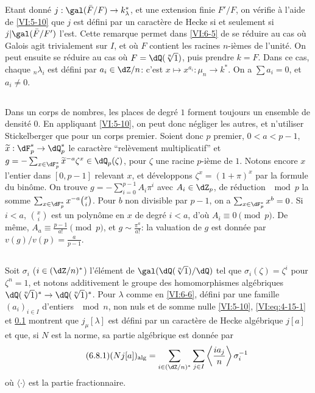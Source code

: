 Etant donné $j:\gal(\bar F/F) \to k_\lambda^\ast$, et une extension finie 
$F'/F$, on vérifie à l'aide de \ref{VI:5-10} que $j$ est défini par un 
caractère de Hecke si et seulement si $j|\gal(\bar F/F')$ l'est. Cette 
remarque permet dans \ref{VI:6-5} de se réduire au cas où Galois agit 
trivialement sur $I$, et où $F$ contient les racines $n$-ièmes de 
l'unité. On peut ensuite se réduire au cas où $F=\dQ(\sqrt[n]{1})$, puis 
prendre $k=F$. Dans ce cas, chaque $_n \lambda_i$ est défini par 
$a_i\in \dZ/n$: c'est $x\mapsto x^{a_i}:\mu_n \to k^\ast$. On a 
$\sum a_i=0$, et $a_i\ne 0$. 





\subsection{}\label{VI:6-7}

Dans un corps de nombres, les places de degré $1$ forment toujours un 
ensemble de densité $0$. En appliquant \ref{VI:5-10}, on peut donc négliger 
les autres, et n'utiliser Stickelberger que pour un corps premier. Soient donc 
$p$ premier, $0<a<p-1$, $\widetilde x:\dF_p^\ast \to \dQ_p^\ast$ le 
caractère ``relèvement multiplicatif'' et 
$g=-\sum_{x\in \dF_p^\ast} \widetilde x^{-a} \zeta^x\in \dQ_p(\zeta)$, pour 
$\zeta$ une racine $p$-ième de $1$. Notons encore $x$ l'entier dans $[0,p-1]$ 
relevant $x$, et développons $\zeta^x=(1+\pi)^x$ par la formule du binôme. 
On trouve $g=-\sum_{i=0}^{p-1} A_i\pi^i$ avec $A_i\in \dZ_p$, de réduction 
$\mod p$ la somme $\sum_{x\in \dF_p^\ast} x^{-a} \binom x i$. Pour $b$ non 
divisible par $p-1$, on a $\sum_{x\in \dF_p^\ast} x^b=0$. Si $i<a$, 
$\binom x i$ est un polynôme en $x$ de degré $i<a$, d'où 
$A_i\equiv 0\pmod p$. De même, $A_a\equiv \frac{p-1}{a!} \pmod p$, et 
$g\sim \frac{\pi^a}{a!}$: la valuation de $g$ est donnée par 
$v(g)/v(p) = \frac{a}{p-1}$. 





\subsection{}\label{VI:6-8}

Soit $\sigma_i$ ($i\in (\dZ/n)^\ast$) l'élément de 
$\gal(\dQ(\sqrt[n]{1})/\dQ)$ tel que $\sigma_i(\zeta)=\zeta^i$ pour $\zeta^n=1$, 
et notons additivement le groupe des homomorphismes algébriques 
$\dQ(\sqrt[n]{1})^\ast \to \dQ(\sqrt[n]{1})^\ast$. Pour $\lambda$ comme en 
\ref{VI:6-6}, défini par une famille $(a_i)_{i\in I}$ d'entiers $\mod n$, non 
nuls et de somme nulle \ref{VI:5-10}, \eqref{VI:eq:4-15-1} et \ref{VI:6-7} 
montrent que $j_\mu[\lambda]$ est défini par un caractère de Hecke 
algébrique $j[a]$ et que, si $N$ est la norme, sa partie algébrique est 
donnée par 
\begin{equation*}\tag{6.8.1}\label{VI:eq:6-8-1}
  (N j[a])_\text{alg} = \sum_{i\in (\dZ/n)^\ast} \sum_{j\in I} \left\langle \frac{i a_j}{n} \right\rangle \sigma_i^{-1} 
\end{equation*}
où $\langle \cdot \rangle$ est la partie fractionnaire. 





